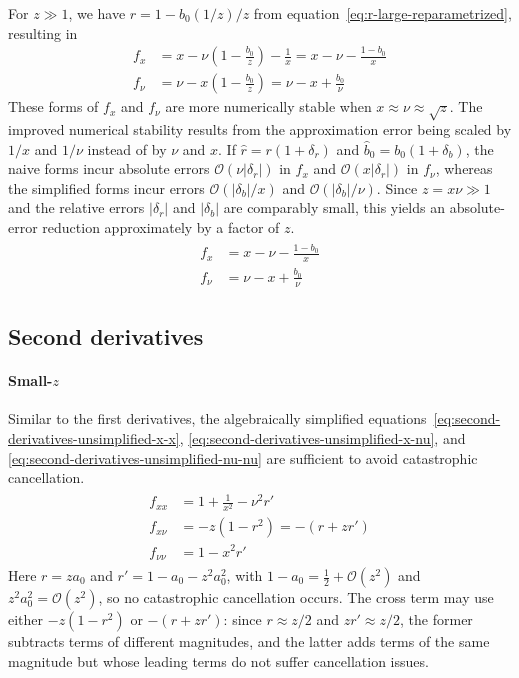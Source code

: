 \documentclass{article}
\begin{document}
For $z \gg 1$, we have $r = 1 - b_0(1/z) / z$ from equation~\eqref{eq:r-large-reparametrized}, resulting in
%
\begin{align}
  f_x   & = x - \nu (1 - \frac{b_0}{z}) - \frac{1}{x}
  = x - \nu - \frac{1 - b_0}{x}                       \\
  f_\nu & = \nu - x (1 - \frac{b_0}{z})
  = \nu - x + \frac{b_0}{\nu}
\end{align}
%
These forms of $f_x$ and $f_\nu$ are more numerically stable when $x \approx \nu \approx \sqrt{z}$.
The improved numerical stability results from the approximation error being scaled by $1/x$ and $1/\nu$ instead of by $\nu$ and $x$.
If $\hat{r}=r(1+\delta_r)$ and $\hat{b}_0=b_0(1+\delta_b)$, the naive forms incur absolute errors $\mathcal{O}(\nu|\delta_r|)$ in $f_x$ and $\mathcal{O}(x|\delta_r|)$ in $f_\nu$, whereas the simplified forms incur errors $\mathcal{O}(|\delta_b|/x)$ and $\mathcal{O}(|\delta_b|/\nu)$.
Since $z = x\nu \gg 1$ and the relative errors $|\delta_r|$ and $|\delta_b|$ are comparably small, this yields an absolute-error reduction approximately by a factor of $z$.
%
%
\begin{align}\label{eq:first-derivatives-large-z}
  \boxed{
    \begin{aligned}
      f_x   & = x - \nu - \frac{1 - b_0}{x} \\
      f_\nu & = \nu - x + \frac{b_0}{\nu}
    \end{aligned}
  }
\end{align}

\subsection{Second derivatives}

\paragraph{Small-$z$}

Similar to the first derivatives, the algebraically simplified equations~\eqref{eq:second-derivatives-unsimplified-x-x}, \eqref{eq:second-derivatives-unsimplified-x-nu}, and \eqref{eq:second-derivatives-unsimplified-nu-nu} are sufficient to avoid catastrophic cancellation.
%
%
\begin{align}\label{eq:second-derivatives-small-z}
  \boxed{
    \begin{aligned}
      f_{xx}     & = 1 + \frac{1}{x^2} - \nu^2 r' \\
      f_{x\nu}   & = -z (1 - r^2) = -(r+z r')     \\
      f_{\nu\nu} & = 1 - x^2 r'
    \end{aligned}
  }
\end{align}
%
Here $r= z a_0$ and $r' = 1-a_0 - z^2 a_0^2$, with $1-a_0=\frac{1}{2}+\mathcal{O}(z^2)$ and $z^2 a_0^2=\mathcal{O}(z^2)$, so no catastrophic cancellation occurs.
The cross term may use either $-z(1-r^2)$ or $-(r+z r')$:
since $r \approx z/2$ and $zr' \approx z/2$, the former subtracts terms of different magnitudes, and the latter adds terms of the same magnitude but whose leading terms do not suffer cancellation issues.
\end{document}
